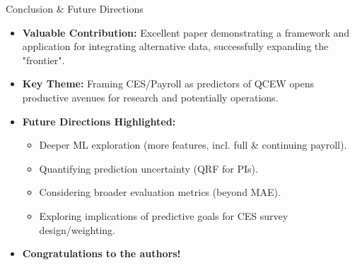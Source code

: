 \documentclass{beamer}
\begin{document}
\begin{frame}{Conclusion \& Future Directions}
    \begin{itemize}
        \item \textbf{Valuable Contribution:} Excellent paper demonstrating a framework and application for integrating alternative data, successfully expanding the "frontier".
        \item \textbf{Key Theme:} Framing CES/Payroll as predictors of QCEW opens productive avenues for research and potentially operations.
        \item \textbf{Future Directions Highlighted:}
        \begin{itemize}
            \item Deeper ML exploration (more features, incl. full & continuing payroll).
            \item Quantifying prediction uncertainty (QRF for PIs).
            \item Considering broader evaluation metrics (beyond MAE).
            \item Exploring implications of predictive goals for CES survey design/weighting.
        \end{itemize}
        \item \textbf{Congratulations to the authors!}
    \end{itemize}
\end{frame}
\end{document}
